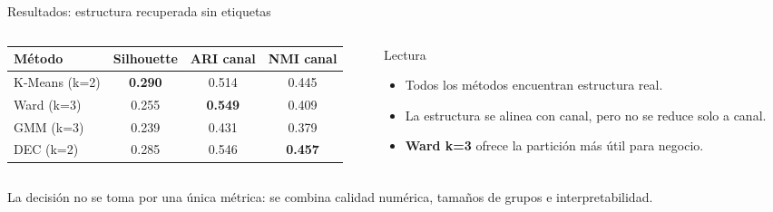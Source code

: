 \documentclass[aspectratio=169,10pt]{beamer}
\newcommand{\highlight}[1]{\textcolor{DeepTeal}{\textbf{#1}}}
\newcommand{\smallnote}[1]{{\scriptsize\textcolor{Muted}{#1}}}
\begin{document}
\begin{frame}{Resultados: estructura recuperada sin etiquetas}
  \begin{columns}[T,onlytextwidth]
    \begin{column}{0.58\textwidth}
      \begin{table}
        \centering
        \scriptsize
        \begin{tabular}{lccc}
          \toprule
          M\'etodo & Silhouette & ARI canal & NMI canal \\
          \midrule
          K-Means (k=2) & \textbf{0.290} & 0.514 & 0.445 \\
          Ward (k=3) & 0.255 & \textbf{0.549} & 0.409 \\
          GMM (k=3) & 0.239 & 0.431 & 0.379 \\
          DEC (k=2) & 0.285 & 0.546 & \textbf{0.457} \\
          \bottomrule
        \end{tabular}
      \end{table}
    \end{column}
    \begin{column}{0.38\textwidth}
      \begin{block}{Lectura}
        \begin{itemize}
          \item Todos los m\'etodos encuentran estructura real.
          \item La estructura se alinea con canal, pero no se reduce solo a canal.
          \item \highlight{Ward k=3} ofrece la partici\'on m\'as \'util para negocio.
        \end{itemize}
      \end{block}
    \end{column}
  \end{columns}

  \vspace{0.25cm}
  \smallnote{La decisi\'on no se toma por una \'unica m\'etrica: se combina calidad num\'erica, tama\~nos de grupos e interpretabilidad.}
\end{frame}
\end{document}

